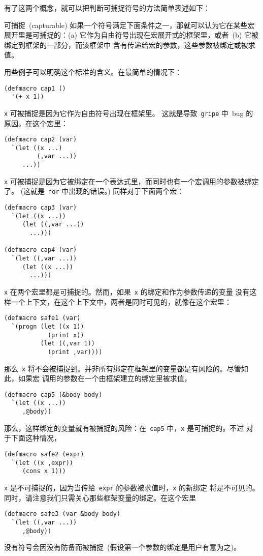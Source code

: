 有了这两个概念，就可以把判断可捕捉符号的方法简单表述如下：

\begin{defineit}{可捕捉~(capturable)}
如果一个符号满足下面条件之一，那就可以认为它在某些宏展开里是可捕捉的：(a)
它作为自由符号出现在宏展开式的框架里，或者~(b) 它被绑定到框架的一部分，而该框架中
含有传递给宏的参数，这些参数被绑定或被求值。
\end{defineit}

用些例子可以明确这个标准的含义。在最简单的情况下：
\begin{lstlisting}
(defmacro cap1 ()
  '(+ x 1))
\end{lstlisting}
\texttt{x} 可被捕捉是因为它作为自由符号出现在框架里。 这就是导致~\texttt{gripe}
中~bug 的原因。在这个宏里：
\begin{lstlisting}
(defmacro cap2 (var)
  `(let ((x ...)
         (,var ...))
     ...))
\end{lstlisting}
\texttt{x} 可被捕捉是因为它被绑定在一个表达式里，而同时也有一个宏调用的参数被绑定了。
(这就是~\texttt{for} 中出现的错误。) 同样对于下面两个宏：
\begin{lstlisting}
(defmacro cap3 (var)
  `(let ((x ...))
     (let ((,var ...))
       ...)))

(defmacro cap4 (var)
  `(let ((,var ...))
     (let ((x ...))
       ...)))
\end{lstlisting}
\texttt{x} 在两个宏里都是可捕捉的。然而，如果~\texttt{x} 的绑定和作为参数传递的变量
没有这样一个上下文，在这个上下文中，两者是同时可见的，就像在这个宏里：
\begin{lstlisting}
(defmacro safe1 (var)
  `(progn (let ((x 1))
            (print x))
          (let ((,var 1))
            (print ,var))))
\end{lstlisting}
那么~\texttt{x} 将不会被捕捉到。并非所有绑定在框架里的变量都是有风险的。尽管如此，如果宏
调用的参数在一个由框架建立的绑定里被求值，
\begin{lstlisting}
(defmacro cap5 (&body body)
  `(let ((x ...))
     ,@body))
\end{lstlisting}
那么，这样绑定的变量就有被捕捉的风险：在~\verb|cap5| 中，\verb|x| 是可捕捉的。不过
对于下面这种情况，
\begin{lstlisting}
(defmacro safe2 (expr)
  `(let ((x ,expr))
     (cons x 1)))
\end{lstlisting}
\texttt{x} 是不可捕捉的，因为当传给~\verb|expr| 的参数被求值时，\verb|x| 的新绑定
将是不可见的。同时，请注意我们只需关心那些框架变量的绑定。在这个宏里
\begin{lstlisting}
(defmacro safe3 (var &body body)
  `(let ((,var ...))
     ,@body))
\end{lstlisting}
没有符号会因没有防备而被捕捉~(假设第一个参数的绑定是用户有意为之)。

